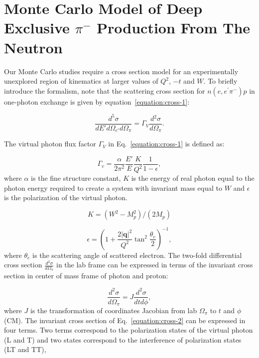 \section{Monte Carlo Model of Deep Exclusive $\pi^{-}$ Production From The
  Neutron}

Our Monte Carlo studies require a
cross section model for an experimentally unexplored region of kinematics
at larger values of $Q^2$, $-t$ and $W$.
To briefly introduce the formalism, note that the scattering cross section
for $n(e,e^{\prime}\pi^{-})p$ in one-photon exchange is given by
equation~\ref{equation:cross-1}:

\begin{equation}
  \frac{d^{5} \sigma}{dE' d\Omega_{e'} d\Omega_{\pi}} = \Gamma_{V} \frac{d{^2}
    \sigma}{d\Omega_{\pi}}.
  \label{equation:cross-1}
\end{equation}

The virtual photon flux factor $\Gamma_{V}$ in Eq.~\ref{equation:cross-1} is
defined as:

\begin{equation}
  \Gamma_v=\frac{\alpha}{2\pi^2} \frac{E'}{E} \frac{K}{Q^2}\frac{1}{1-\epsilon},
  \label{equation:photon-flux-1}
\end{equation}
where $\alpha$ is the fine structure constant, $K$ is the energy of real photon
equal to the photon energy required to create a system with invariant mass
equal to $W$ and $\epsilon$ is the polarization of the virtual photon.

\begin{equation}
  K=(W^2-M_p^2)/(2 M_p)
  \label{equation:photon-flux-2}
\end{equation}

\begin{equation}
  \epsilon=\left(1+\frac{2 |\mathbf{q}|^2}{Q^2} \tan^2\frac{\theta_{e}}{2}
  \right)^{-1},
  \label{equation:photon-flux-3}
\end{equation}
where $\theta_{e}$ is the scattering angle of scattered electron. The two-fold
differential cross section $\frac{d{^2} \sigma}{d\Omega_{\pi}}$ in the lab
frame can be expressed in terms of the invariant cross section in center of
mass frame of photon and proton:

\begin{equation}
  \frac{d^2 \sigma}{d\Omega_\pi}= J \frac{d^2 \sigma}{dt d\phi},
  \label{equation:cross-2}
\end{equation}
where $J$ is the transformation of coordinates Jacobian from lab
$\Omega_{\pi}$ to $t$ and $\phi$ (CM). The invariant cross section of
Eq.~\ref{equation:cross-2} can be expressed in four terms. Two terms correspond
to the polarization states of the virtual photon (L and T) and two states
correspond to the interference of polarization states (LT and TT),

